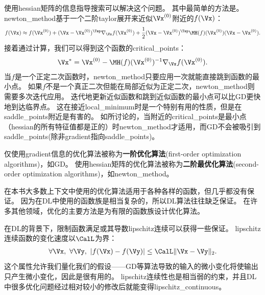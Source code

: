 使用\gls{hessian}矩阵的信息指导搜索可以解决这个问题。
其中最简单的方法是。
\gls{newton_method}基于一个二阶\gls{taylor}展开来近似$\Vx^{(0)}$附近的$f(\Vx)$：
\begin{align}
 f(\Vx) \approx f(\Vx^{(0)}) + (\Vx - \Vx^{(0)})^\Tsp \nabla_{\Vx} f(\Vx^{(0)}) + 
 \frac{1}{2}  (\Vx - \Vx^{(0)})^\Tsp \MH(f)(\Vx^{(0)})  (\Vx - \Vx^{(0)}).
\end{align}
接着通过计算，我们可以得到这个函数的\gls{critical_points}：
\begin{align} \label{eq:newtonstep}
 \Vx^* =  \Vx^{(0)} -  \MH(f)(\Vx^{(0)})^{-1}  \nabla_{\Vx} f(\Vx^{(0)}) .
\end{align}
当$f$是一个正定二次函数时，\gls{newton_method}只要应用一次就能直接跳到函数的最小点。
如果$f$不是一个真正二次但能在局部近似为正定二次，\gls{newton_method}则需要多次迭代应用。
迭代地更新近似函数和跳到近似函数的最小点可以比\gls{GD}更快地到达临界点。
这在接近\gls{local_minimum}时是一个特别有用的性质，但是在\gls{saddle_points}附近是有害的。
如所讨论的，当附近的\gls{critical_points}是最小点（\gls{hessian}的所有特征值都是正的）时\gls{newton_method}才适用，而\gls{GD}不会被吸引到\gls{saddle_points}(除非\gls{gradient}指向\gls{saddle_points})。

仅使用\gls{gradient}信息的优化算法被称为\textbf{一阶优化算法}(first-order optimization algorithms)，如\gls{GD}。
使用\gls{hessian}矩阵的优化算法被称为\textbf{二阶最优化算法}(second-order optimization algorithms)\citep{NumOptBook}，如\gls{newton_method}。

在本书大多数上下文中使用的优化算法适用于各种各样的函数，但几乎都没有保证。
因为在\gls{DL}中使用的函数族是相当复杂的，所以\gls{DL}算法往往缺乏保证。
在许多其他领域，优化的主要方法是为有限的函数族设计优化算法。

在\gls{DL}的背景下，限制函数满足或其导数\gls{lipschitz}连续可以获得一些保证。
\gls{lipschitz}连续函数的变化速度以$\CalL$为界：
\begin{align}
 \forall \Vx,~\forall \Vy, ~| f(\Vx) - f(\Vy)|  \leq \CalL \| \Vx - \Vy \|_2 .
\end{align}
这个属性允许我们量化我们的假设——\gls{GD}等算法导致的输入的微小变化将使输出只产生微小变化，因此是很有用的。
\gls{lipschitz}连续性也是相当弱的约束，并且\gls{DL}中很多优化问题经过相对较小的修改后就能变得\gls{lipschitz_continuous}。


